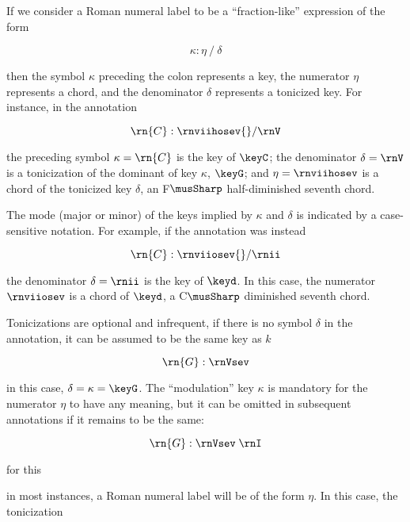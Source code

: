 
If we consider a Roman numeral label to be a
``fraction-like'' expression of the form

\begin{equation}
    \kappa : \eta \: / \: \delta
\end{equation}

then the symbol $\kappa$ preceding the colon represents a
key, the numerator $\eta$ represents a chord, and the
denominator $\delta$ represents a tonicized key. For
instance, in the annotation 

\begin{equation}
    \rn{C}:\rnviihosev{}/\rnV
\end{equation}

the preceding symbol $\kappa=\rn{C}$ is the key of $\keyC$;
the denominator $\delta = \rnV$ is a tonicization of the
dominant of key $\kappa$, $\keyG$; and $\eta=\rnviihosev$ is
a chord of the tonicized key $\delta$, an F$\musSharp$
half-diminished seventh chord.

The mode (major or minor) of the keys implied by $\kappa$
and $\delta$ is indicated by a case-sensitive notation. For
example, if the annotation was instead

\begin{equation}
    \rn{C}:\rnviiosev{}/\rnii
\end{equation}

the denominator $\delta=\rnii$ is the key of $\keyd$. In
this case, the numerator $\rnviiosev$ is a chord of $\keyd$,
a C$\musSharp$ diminished seventh chord.

Tonicizations are optional and infrequent, if there is no
symbol $\delta$ in the annotation, it can be assumed to be
the same key as $k$

\begin{equation}
    \rn{G}:\rnVsev
\end{equation}

in this case, $\delta = \kappa = \keyG$. The ``modulation''
key $\kappa$ is mandatory for the numerator $\eta$ to have
any meaning, but it can be omitted in subsequent annotations
if it remains to be the same:

\begin{equation}
    \rn{G}:\rnVsev \; \rnI
\end{equation}

for this 

in most instances, a Roman numeral label will be of the form
$\eta$. In this case, the tonicization 
